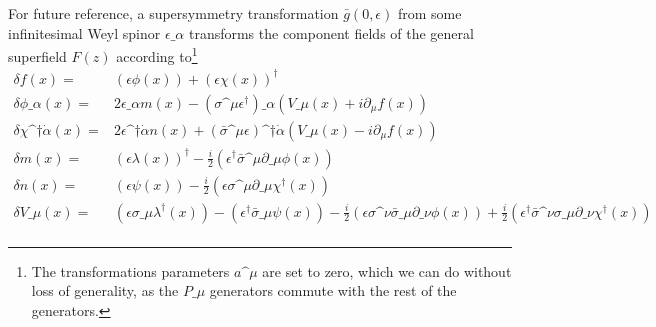 \documentclass[../main.tex]{subfiles}
\begin{document}
\begin{temporary}
  For future reference, a supersymmetry transformation \(\bar{g}(0, \epsilon)\) from some infinitesimal Weyl spinor \(\epsilon\_\alpha\) transforms the component fields of the general superfield \(F(z)\) according to\footnote{The transformations parameters \(a\^\mu\) are set to zero, which we can do without loss of generality, as the \(P\_\mu\) generators commute with the rest of the generators.}\needcite
  \begin{subequations}
    \begin{align}
      \delta f(x) =                         & (\epsilon\phi(x)) + (\epsilon \chi(x))^\dagger                                                                                                                                                                                                               \\
      \delta \phi\_\alpha(x) =              & 2\epsilon\_\alpha m(x) - (\sigma\^\mu \epsilon^\dagger)\_\alpha (V\_\mu(x) + i\partial_\mu f(x))                                                                                                                                                             \\
      \delta \chi\^{\dagger\dot\alpha}(x) = & 2\epsilon\^{\dagger\dot\alpha} n(x) + (\bar\sigma\^\mu \epsilon)\^{\dagger\dot\alpha} (V\_\mu(x) - i\partial_\mu f(x))                                                                                                                                       \\
      \delta m(x) =                         & (\epsilon \lambda(x))^\dagger - \frac{i}{2} (\epsilon^\dagger \bar\sigma\^\mu \partial\_\mu \phi(x))                                                                                                                                                         \\
      \delta n(x) =                         & (\epsilon \psi(x)) - \frac{i}{2} (\epsilon \sigma\^\mu \partial\_\mu \chi^\dagger(x))                                                                                                                                                                        \\
      \delta V\_\mu(x) =                    & (\epsilon \sigma\_\mu \lambda^\dagger(x)) - (\epsilon^\dagger \bar\sigma\_\mu \psi(x)) - \frac{i}{2} (\epsilon \sigma\^\nu \bar\sigma\_\mu \partial\_\nu \phi(x)) + \frac{i}{2} (\epsilon^\dagger \bar\sigma\^\nu \sigma\_\mu \partial\_\nu \chi^\dagger(x)) \\

\end{align}
\end{subequations}
\end{temporary}
\end{document}
